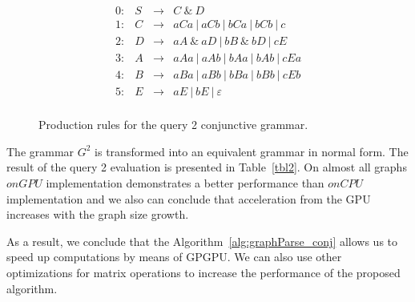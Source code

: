 \begin{figure}[h]
	\[
	\begin{array}{rccl}
	0: & S & \rightarrow & C ~\& ~ D \\ 
	1: & C & \rightarrow & aCa~|~aCb~|~bCa~|~bCb~|~c\\ 
	2: & D & \rightarrow & aA ~\& ~aD~|~bB ~\& ~bD~|~cE \\ 
	3: & A & \rightarrow & aAa~|~aAb~|~bAa~|~bAb~|~cEa\\ 
	4: & B & \rightarrow & aBa~|~aBb~|~bBa~|~bBb~|~cEb \\
	5: & E & \rightarrow & aE~|~bE~|~\varepsilon \\ 
	\end{array}
	\]
	\caption{Production rules for the query 2 conjunctive grammar.}
	\label{ProductionRulesQuery2}
\end{figure}

The grammar $G^2$ is transformed into an equivalent grammar in normal form. The result of the query 2 evaluation is presented in Table~\ref{tbl2}. On almost all graphs $onGPU$ implementation demonstrates a better performance than $onCPU$ implementation and we also can conclude that acceleration from the GPU increases with the graph size growth.

As a result, we conclude that the Algorithm~\ref{alg:graphParse_conj} allows us to speed up computations by means of GPGPU. We can also use other optimizations for matrix operations to increase the performance of the proposed algorithm.
